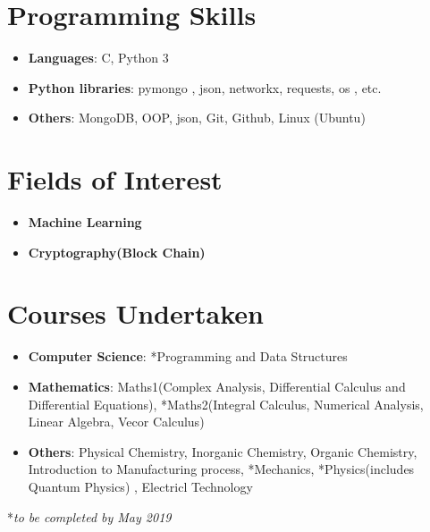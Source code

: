 \documentclass[letterpaper,11pt]{article}
\newcommand{\resumeSubHeadingListStart}{\begin{itemize}[leftmargin=*]}
\newcommand{\resumeSubHeadingListEnd}{\end{itemize}}
\begin{document}
%
\section{Programming Skills}
 \resumeSubHeadingListStart
   \item{
     \textbf{Languages}{: C, Python 3}
     \hfill
   }
   \item{
     \textbf{Python libraries}{: pymongo , json, networkx, requests, os , etc. }
     \hfill
   }
   \item{
     \textbf{Others}{: MongoDB, OOP, json, Git, Github, Linux (Ubuntu)}
     \hfill
   }
 \resumeSubHeadingListEnd
\section{Fields of Interest}
  \resumeSubHeadingListStart
  \item{
    \textbf{Machine Learning}
    \hfill
  }
  \item{
    \textbf{Cryptography(Block Chain)}
    \hfill
  }
  \resumeSubHeadingListEnd
\section{Courses Undertaken}
  \resumeSubHeadingListStart
  \item{
    \textbf{Computer Science}{: *Programming and Data Structures}
    \hfill
  }
  \item{  
    \textbf{Mathematics}{: Maths1(Complex Analysis, Differential Calculus and Differential Equations), *Maths2(Integral Calculus, Numerical Analysis, Linear Algebra, Vecor Calculus)}
    \hfill
  }
  \item{
    \textbf{Others}{: Physical Chemistry, Inorganic Chemistry, Organic Chemistry, Introduction to Manufacturing process, *Mechanics, *Physics(includes Quantum Physics) , Electricl Technology}
  }
  \resumeSubHeadingListEnd
  {*}\textit{to be completed by May 2019}
\end{document}
